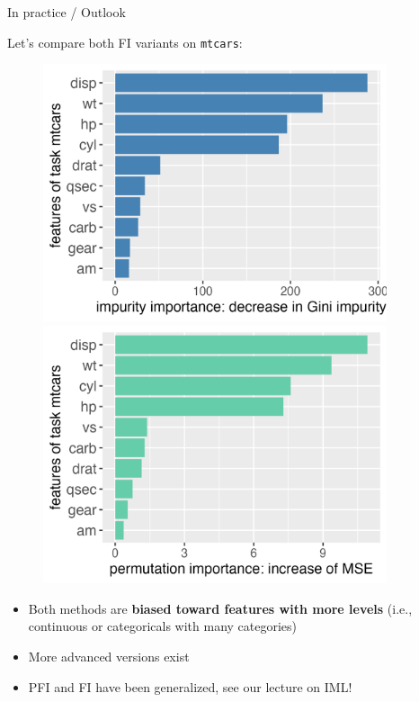\documentclass[11pt,compress,t,notes=noshow, xcolor=table]{beamer}
\begin{document}
\begin{frame2}{In practice / Outlook}

Let's compare both FI variants on \texttt{mtcars}:
\begin{figure}
\centering
\begin{minipage}{.5\textwidth}
  \centering
  \includegraphics[width=0.9\textwidth]{figure/forest-fimp_gini.png}
\end{minipage}%
\begin{minipage}{.5\textwidth}
  \centering
  \includegraphics[width=0.9\textwidth]{figure/forest-fimp_perm.png}
\end{minipage}
\end{figure}


\lz
\begin{itemize}

  \item Both methods are \textbf{biased toward features with more levels} (i.e., continuous or categoricals with many categories) 
  \item More advanced versions exist
  \item PFI and FI have been generalized, see our lecture on IML!

\end{itemize}
\end{frame2}

\endlecture
\end{document}
